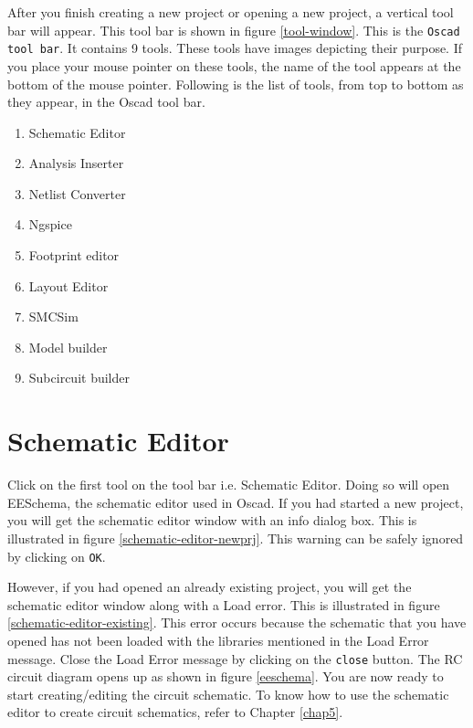 After you finish creating a new project or opening a new project, a vertical tool bar will appear. This tool bar is shown in figure \ref{tool-window}. This is the {\tt Oscad tool bar}. It contains 9 tools. These tools have images depicting their purpose. If you place your mouse pointer on these tools, the name of the tool appears at the bottom of the mouse pointer. Following is the list of tools,  from top to bottom as they appear, in the Oscad tool bar.

\begin{enumerate}
\item Schematic Editor
\item Analysis Inserter
\item Netlist Converter
\item Ngspice
\item Footprint editor
\item Layout Editor
\item SMCSim
\item Model builder
\item Subcircuit builder
\end{enumerate}

\section{Schematic Editor}
Click on the first tool on the tool bar i.e. Schematic Editor. Doing so will open EESchema, the schematic editor used in Oscad. If you had started a new project, you will get the schematic editor window with an info dialog box. This is illustrated in figure \ref{schematic-editor-newprj}. This warning can be safely ignored by clicking on {\tt OK}. 

However, if you had opened an already existing project, you will get the schematic editor window along with a Load error. This is illustrated in figure \ref {schematic-editor-existing}. This error occurs because the schematic that you have opened has not been loaded with the libraries mentioned in the Load Error message. Close the Load Error message by clicking on the {\tt close} button. The RC circuit diagram opens up as shown in figure \ref{eeschema}. You are now ready to start creating/editing the circuit schematic. To know how to use the schematic editor to create circuit schematics, refer to Chapter \ref{chap5}.

